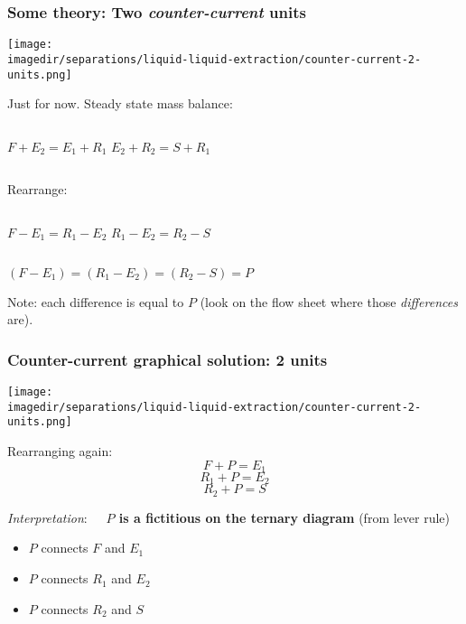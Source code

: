 \begin{frame}\frametitle{Some theory: Two \emph{counter-current} units}
	\begin{center}
		\texttt{[image: \\imagedir/separations/liquid-liquid-extraction/counter-current-2-units.png]}
	\end{center}
	Just \textbf{{\color{myGreen}{consider $N=2$ stages}}} for now. Steady state mass balance:
	\begin{center}
		\begin{columns}[t]
				$F + E_2 = E_1 + R_1$
				$E_2 + R_2 = S + R_1$
		\end{columns}
	\end{center}
	Rearrange:
	\begin{center}		
		\begin{columns}[t]
				$F - E_1 = R_1 - E_2$
				$R_1 - E_2 = R_2 - S$
		\end{columns}
		\vspace{12pt}
		$(F - E_1)  =  (R_1 - E_2) = (R_2 - S) = P$
	\end{center}
	Note: each difference is equal to $P$ (look on the flow sheet where those \emph{differences} are).
\end{frame}

\begin{frame}\frametitle{Counter-current graphical solution: 2 units}
	\begin{center}
		\texttt{[image: \\imagedir/separations/liquid-liquid-extraction/counter-current-2-units.png]}
	\end{center}
		
	Rearranging again:
	\[	F + P = E_1 \]
	\[	R_1 + P = E_2 \]
	\[	R_2 + P = S \]
		
	\emph{Interpretation}: \textbf{~~$P$ is a fictitious {\color{purple}{operating point}} on the ternary diagram} (from lever rule)
	\vspace{6pt}
	\begin{itemize}
		\item	$P$ connects $F$ and $E_1$ 
		\item	$P$ connects $R_1$ and $E_2$ 
		\item	$P$ connects $R_2$ and $S$
	\end{itemize}
\end{frame}

